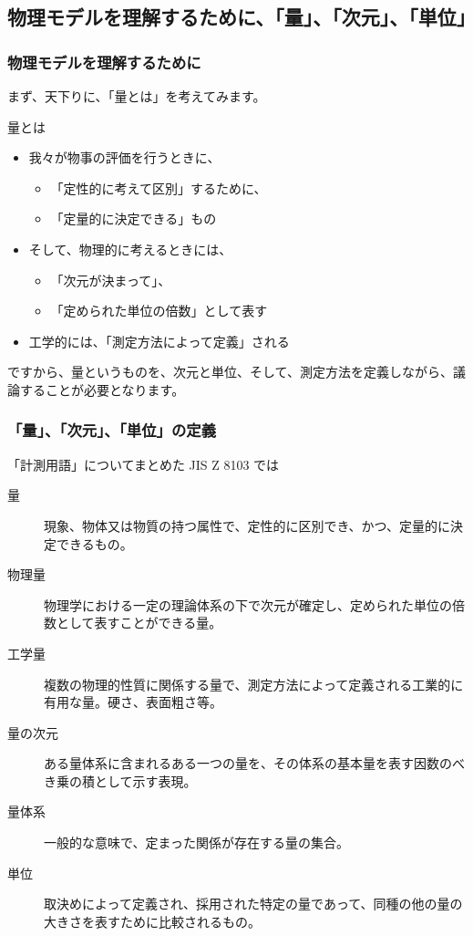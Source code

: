 \documentclass[12pt, dvipdfmx]{beamer}
\begin{document}
\subsection{物理モデルを理解するために、「量」、「次元」、「単位」}
\begin{frame}
	\frametitle{物理モデルを理解するために}
	まず、天下りに、「量とは」を考えてみます。
	\begin{block}{量とは}
		\begin{itemize}
			\item 我々が物事の評価を行うときに、
			\begin{itemize}
				\item 「定性的に考えて区別」するために、
				\item 「定量的に決定できる」もの
			\end{itemize}
			\item そして、物理的に考えるときには、
			\begin{itemize}
				\item 「次元が決まって」、
				\item 「定められた単位の倍数」として表す
			\end{itemize}
			\item 工学的には、「測定方法によって定義」される
		\end{itemize}
	\end{block}
	ですから、量というものを、次元と単位、そして、測定方法を定義しながら、議論することが必要となります。
\end{frame}

\begin{frame}
	\frametitle{「量」、「次元」、「単位」の定義}
	\footnotesize
	\begin{exampleblock}{「計測用語」についてまとめた JIS Z 8103 では}
		\begin{description}
			\item[量] 現象、物体又は物質の持つ属性で、定性的に区別でき、かつ、定量的に決定できるもの。
			\item[物理量] 物理学における一定の理論体系の下で次元が確定し、定められた単位の倍数として表すことができる量。
			\item[工学量] 複数の物理的性質に関係する量で、測定方法によって定義される工業的に有用な量。硬さ、表面粗さ等。
			\item[量の次元] ある量体系に含まれるある一つの量を、その体系の基本量を表す因数のべき乗の積として示す表現。
			\item[量体系] 一般的な意味で、定まった関係が存在する量の集合。
			\item[単位] 取決めによって定義され、採用された特定の量であって、同種の他の量の大きさを表すために比較されるもの。
		\end{description}
	\end{exampleblock}
\end{frame}
\end{document}
